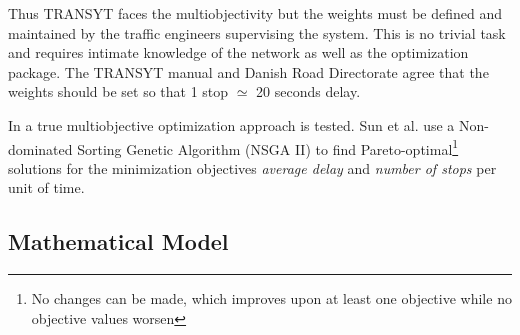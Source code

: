 Thus TRANSYT faces the multiobjectivity but the weights must be defined and maintained by the traffic engineers supervising the system. This is no trivial task and requires intimate knowledge of the network as well as the optimization package. The TRANSYT manual and Danish Road Directorate agree that the weights should be set so that 1 stop $\simeq$ 20 seconds delay.

In \cite{41} a true multiobjective optimization approach is tested. Sun et al. use a Non-dominated Sorting Genetic Algorithm (NSGA II) to find Pareto-optimal\footnote{No changes can be made, which improves upon at least one objective while no objective values worsen} solutions for the minimization objectives \textit{average delay} and \textit{number of stops} per unit of time. 

\subsection{Mathematical Model}

